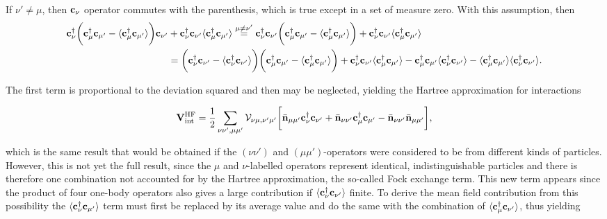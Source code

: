 \documentclass{homework}
\begin{document}
If $\nu' \neq \mu$, then ${\bf c}_{\nu}$ operator commutes with the parenthesis, which is true except in a set of measure zero. With this assumption, then 
\begin{equation}
    \begin{split}
    {\bf c}_{\nu}^\dagger \bigg({\bf c}_{\mu}^\dagger {\bf c}_{\mu'} - \langle {\bf c}_{\mu}^\dagger {\bf c}_{\mu'} \rangle \bigg) {\bf c}_{\nu'} &+ {\bf c}_{\nu}^\dagger {\bf c}_{\nu'} \langle {\bf c}_{\mu}^\dagger {\bf c}_{\mu'}\rangle \overset{{\mu \neq \nu'}}{=} {\bf c}_{\nu}^\dagger {\bf c}_{\nu'} \bigg({\bf c}_{\mu}^\dagger {\bf c}_{\mu'} - \langle {\bf c}_{\mu}^\dagger {\bf c}_{\mu'} \rangle \bigg) + {\bf c}_{\nu}^\dagger {\bf c}_{\nu'} \langle {\bf c}_{\mu}^\dagger {\bf c}_{\mu'}\rangle \\
    &= \bigg({\bf c}_{\nu}^\dagger {\bf c}_{\nu'} - \langle {\bf c}_{\nu}^\dagger {\bf c}_{\nu'} \rangle\bigg) \bigg({\bf c}_{\mu}^\dagger {\bf c}_{\mu'} - \langle {\bf c}_{\mu}^\dagger {\bf c}_{\mu'} \rangle \bigg) + {\bf c}_{\nu}^\dagger {\bf c}_{\nu'} \langle {\bf c}_{\mu}^\dagger {\bf c}_{\mu'}\rangle - {\bf c}_{\mu}^\dagger {\bf c}_{\mu'} \langle {\bf c}_{\nu}^\dagger {\bf c}_{\nu'} \rangle - \langle {\bf c}_{\mu}^\dagger {\bf c}_{\mu'} \rangle \langle {\bf c}_{\nu}^\dagger {\bf c}_{\nu'} \rangle.
    \end{split}
\end{equation}

The first term is proportional to the deviation squared and then may be neglected, yielding the Hartree approximation for interactions

\begin{equation}
\begin{split}
    {\bf V}_{\textnormal{int}}^{\textnormal{HF}} = \frac{1}{2} \sum_{\nu\nu', \mu\mu'} {\mathcal V}_{\nu\mu, \nu'\mu'} \bigg[ \bar{\bf n}_{\mu \mu'} {\bf c}_{\nu}^\dagger {\bf c}_{\nu'} + \bar{\bf n}_{\nu \nu'} {\bf c}_{\mu}^\dagger {\bf c}_{\mu'} - \bar{\bf n}_{\nu \nu'} \bar{\bf n}_{\mu \mu'}\bigg],
\end{split}
\end{equation}

which is the same result that would be obtained if the $(\nu \nu')$ and $(\mu \mu')$-operators were considered to be from different kinds of particles. However, this is not yet the full result, since the $\mu$ and $\nu$-labelled operators represent identical, indistinguishable particles and there is therefore one combination not accounted for by the Hartree approximation, the so-called Fock exchange term. This new term appears since the product of four one-body operators also gives a large contribution if $\langle{\bf c}_{\nu}^\dagger {\bf c}_{\nu'} \rangle$ finite. To derive the mean field contribution from this possibility the $\langle {\bf c}_{\nu}^\dagger {\bf c}_{\mu'} \rangle$ term must first be replaced by its average value and do the same with the combination of $\langle {\bf c}_{\mu}^\dagger {\bf c}_{\nu'} \rangle$, thus yielding 
\end{document}
